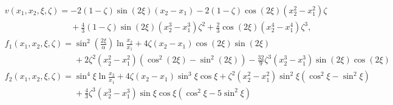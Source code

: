 \documentclass[12pt]{article}
\begin{document}
\begin{subequations}
\begin{align}
&v(x_1,x_2,\xi,\zeta)= -2(1-\zeta)\sin(2\xi)(x_2-x_1)-2(1-\zeta)\cos(2\xi)(x_2^2-x_1^2)\zeta\nonumber\\
&\phantom{v(x_1,x_2,\xi,\zeta)= }+\frac{4}{3}(1-\zeta)\sin(2\xi)(x_2^3-x_1^3)\zeta^2+\frac{2}{3}\cos(2\xi)(x_2^4-x_1^4)\zeta^3,\\
&f_1(x_1,x_2,\xi,\zeta)=\sin^2\left(\frac{2\xi}{\alpha}\right)\ln\frac{x_2}{x_1}+4\zeta(x_2-x_1)\cos(2\xi)\sin(2\xi)\nonumber\\
&\phantom{f_1(x_1,x_2,\xi,\zeta)=}+2\zeta^2(x_2^2-x_1^2)\left(\cos^2(2\xi)-\sin^2(2\xi)\right)-\frac{32}{9}\zeta^3(x_2^3-x_1^3)\sin(2\xi)\cos(2\xi)\\
&f_2(x_1,x_2,\xi,\zeta)=\sin^4\xi\ln\frac{x_2}{x_1}+4\zeta(x_2-x_1)\sin^3\xi\cos\xi+\zeta^2(x_2^2-x_1^2)\sin^2\xi(\cos^2\xi-\sin^2\xi)\nonumber\\
&\phantom{f_2(x_1,x_2,\xi,\zeta)=}+\frac{4}{3}\zeta^3(x_2^3-x_1^3)\sin\xi\cos\xi\left(\cos^2\xi-5\sin^2\xi\right)
\end{align}
\end{subequations}

\clearpage


\end{document}
